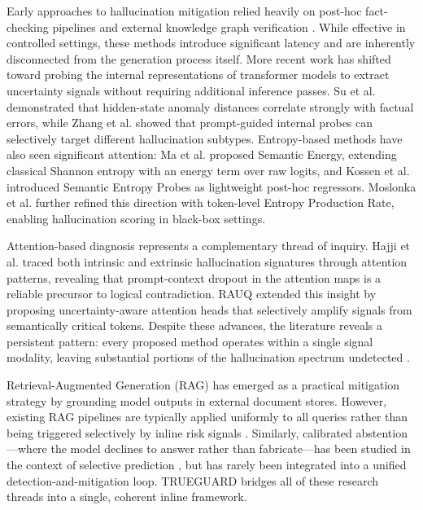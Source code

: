 \documentclass{article}
\begin{document}
Early approaches to hallucination mitigation relied heavily on post-hoc fact-checking pipelines and external knowledge graph verification \cite{min2023factscore,guo2022survey}. While effective in controlled settings, these methods introduce significant latency and are inherently disconnected from the generation process itself. More recent work has shifted toward probing the internal representations of transformer models to extract uncertainty signals without requiring additional inference passes. Su et al. \cite{su2024mind} demonstrated that hidden-state anomaly distances correlate strongly with factual errors, while Zhang et al. \cite{zhang2024prism} showed that prompt-guided internal probes can selectively target different hallucination subtypes. Entropy-based methods have also seen significant attention: Ma et al. \cite{ma2024semantic} proposed Semantic Energy, extending classical Shannon entropy with an energy term over raw logits, and Kossen et al. \cite{kossen2024sep} introduced Semantic Entropy Probes as lightweight post-hoc regressors. Moslonka et al. \cite{moslonka2024epr} further refined this direction with token-level Entropy Production Rate, enabling hallucination scoring in black-box settings.

Attention-based diagnosis represents a complementary thread of inquiry. Hajji et al. \cite{hajji2024map} traced both intrinsic and extrinsic hallucination signatures through attention patterns, revealing that prompt-context dropout in the attention maps is a reliable precursor to logical contradiction. RAUQ \cite{anon2025rauq} extended this insight by proposing uncertainty-aware attention heads that selectively amplify signals from semantically critical tokens. Despite these advances, the literature reveals a persistent pattern: every proposed method operates within a single signal modality, leaving substantial portions of the hallucination spectrum undetected \cite{zhang2024mhad,sriramanan2024llmcheck}.

Retrieval-Augmented Generation (RAG) \cite{lewis2020retrieval} has emerged as a practical mitigation strategy by grounding model outputs in external document stores. However, existing RAG pipelines are typically applied uniformly to all queries rather than being triggered selectively by inline risk signals \cite{yao2025expandr}. Similarly, calibrated abstention---where the model declines to answer rather than fabricate---has been studied in the context of selective prediction \cite{kadavath2022language}, but has rarely been integrated into a unified detection-and-mitigation loop. TRUEGUARD bridges all of these research threads into a single, coherent inline framework.
\end{document}
